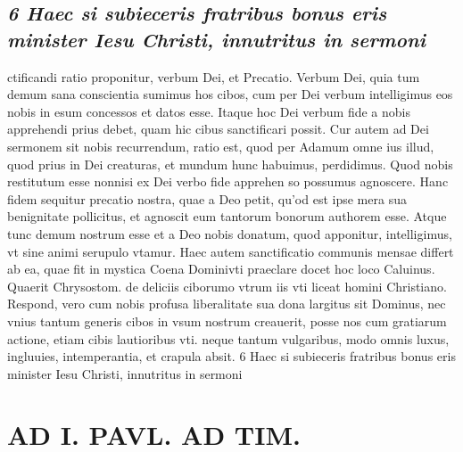 \documentclass{article}
\begin{document}
\begin{pages}
\subsection*{\textit{6 Haec si subieceris fratribus bonus eris minister Iesu Christi, innutritus in sermoni}}ctificandi ratio proponitur, verbum Dei, et Precatio. Verbum Dei, quia tum demum sana conscientia sumimus hos cibos, cum per Dei verbum intelligimus eos nobis in esum concessos et datos esse. Itaque hoc Dei verbum fide a nobis apprehendi prius debet, quam hic cibus sanctificari possit. Cur autem ad Dei sermonem sit nobis recurrendum, ratio est, quod per Adamum omne ius illud, quod prius in Dei creaturas, et mundum hunc habuimus, perdidimus. Quod nobis restitutum esse nonnisi ex Dei verbo fide apprehen so possumus agnoscere. Hanc fidem sequitur precatio nostra, quae a Deo petit, qu'od est ipse mera sua benignitate pollicitus, et agnoscit eum tantorum bonorum authorem esse. Atque tunc demum nostrum esse et a Deo nobis donatum, quod apponitur, intelligimus, vt sine animi serupulo vtamur. Haec autem sanctificatio communis mensae differt ab ea, quae fit in mystica Coena Dominivti praeclare docet hoc loco Caluinus. Quaerit Chrysostom. de deliciis ciborumo vtrum iis vti liceat homini Christiano. Respond, vero cum nobis profusa liberalitate sua dona largitus sit Dominus, nec vnius tantum generis cibos in vsum nostrum creauerit, posse nos cum gratiarum actione, etiam cibis lautioribus vti. neque tantum vulgaribus, modo omnis luxus, ingluuies, intemperantia, et crapula absit. 6 Haec si subieceris fratribus bonus eris minister Iesu Christi, innutritus in sermoni\pend
\section*{AD I. PAVL. AD TIM. }
\marginpar{[ p.200 ]}\pstart {}
{}

\end{pages}
\end{document}
